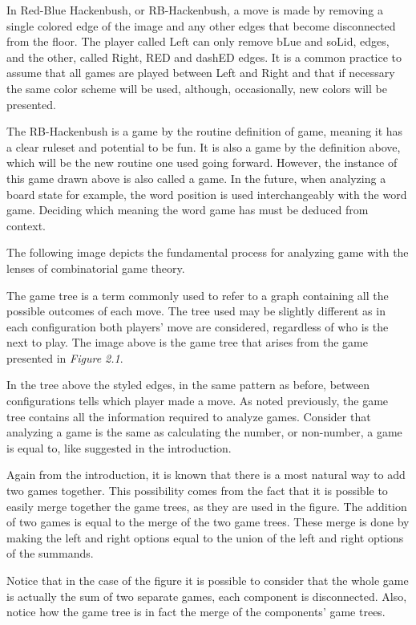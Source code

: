 In Red-Blue Hackenbush, or RB-Hackenbush, a move is made by removing a single colored edge of the image and any other edges that become disconnected from the floor. The player called Left can only remove bLue and soLid, edges, and the other, called Right, RED and dashED edges. It is a common practice to assume that all games are played between Left and Right and that if necessary the same color scheme will be used, although, occasionally, new colors will be presented.

The RB-Hackenbush is a game by the routine definition of game, meaning it has a clear ruleset and potential to be fun. It is also a game by the definition above, which will be the new routine one used going forward. However, the instance of this game drawn above is also called a game. In the future, when analyzing a board state for example, the word position is used interchangeably with the word game. Deciding which meaning the word game has must be deduced from context.

The following image depicts the fundamental process for analyzing game with the lenses of combinatorial game theory.



The game tree is a term commonly used to refer to a graph containing all the possible outcomes of each move. The tree used may be slightly different as in each configuration both players' move are considered, regardless of who is the next to play. The image above is the game tree that arises from the game presented in \textit{Figure 2.1}.

In the tree above the styled edges, in the same pattern as before, between configurations tells which player made a move. As noted previously, the game tree contains all the information required to analyze games. Consider that analyzing a game is the same as calculating the number, or non-number, a game is equal to, like suggested in the introduction.

Again from the introduction, it is known that there is a most natural way to add two games together. This possibility comes from the fact that it is possible to easily merge together the game trees, as they are used in the figure. The addition of two games is equal to the merge of the two game trees. These merge is done by making the left and right options equal to the union of the left and right options of the summands.

Notice that in the case of the figure it is possible to consider that the whole game is actually the sum of two separate games, each component is disconnected. Also, notice how the game tree is in fact the merge of the components' game trees.

